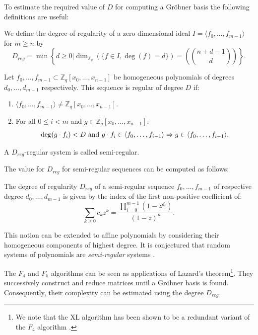 \documentclass{llncs}
\newcommand{\ring}[1]{\mathbb{#1}}
\newcommand{\Z}{\ensuremath{\ring{Z}}\xspace}
\newcommand{\FX}{\ensuremath{\Z_q[x_0,\dots,x_{n-1}]}\xspace}
\newcommand{\sys}{\ensuremath{f_0,\dots,f_{m-1}}\xspace}
\newcommand{\ideal}[1]{\ensuremath{\langle #1 \rangle}\xspace}
\begin{document}
To estimate the required value of $D$ for computing a Gr\"obner basis the following definitions are useful:

\begin{definition}
We define the degree of regularity of a zero dimensional ideal $I = \ideal{f_0,\dots,f_{m-1}}$ for $m \geq n$ by
$$D_{reg} = \min\left\{ d \geq 0 | \dim_{\Z_q}(\{f \in I, \deg(f) = d\}) = \left( {n + d -1}\choose{d} \right)\right\}.$$
\end{definition}

\begin{definition}
Let $\sys \subset \FX$ be homogeneous polynomials of degrees $d_0,\dots,d_{m-1}$ respectively. This sequence is regular of degree $D$ if:
\begin{enumerate}
 \item $\ideal{\sys} \neq \FX$.
 \item For all $0 \leq i < m$ and $g \in \FX$: $$\deg(g\cdot f_i) <
D\textnormal{ and }g\cdot f_i \in \ideal{f_0,\dots,f_{i-1}} \Rightarrow g \in
\ideal{f_0,\dots,f_{i-1}}.$$
\end{enumerate}
\end{definition}


\begin{definition}
A $D_{reg}$-regular system is called semi-regular.
\end{definition}

The value for $D_{reg}$ for semi-regular sequences can be computed as follows:

\begin{lemma}
\label{lemma:dreg}
The degree of regularity $D_{reg}$ of a semi-regular sequence \sys of respective degree $d_0,\dots,d_{m-1}$ is given by the index of the first non-positive coefficient of:
\[
 \sum_{k\geq 0} c_k z^k = \frac{\prod_{i=0}^{m-1} (1-z^{d_i})}{(1-z)^n}.
\]
\end{lemma}

This notion can be extended to affine polynomials by considering their homogeneous components of highest degree. It is conjectured that random systems of polynomials are \emph{semi-regular} systems \cite{Bardet}.

The $F_4$ \cite{F4} and $F_5$ \cite{F5} algorithms can be seen as applications of Lazard's theorem\footnote{We note that the XL algorithm has been shown to be a redundant variant of the $F_4$ algorithm \cite{ars-faugere:asiacrypt04}.}. They successively construct and reduce matrices until a Gr\"{o}bner basis is found. Consequently, their complexity can be estimated using the degree $D_{reg}$.
\end{document}
